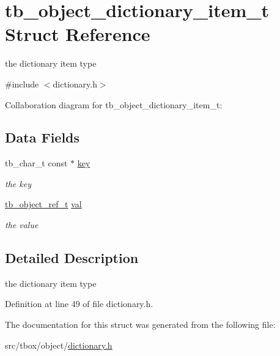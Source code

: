 \hypertarget{structtb__object__dictionary__item__t}{\section{tb\-\_\-object\-\_\-dictionary\-\_\-item\-\_\-t Struct Reference}
\label{structtb__object__dictionary__item__t}
}


the dictionary item type  




{\ttfamily \#include $<$dictionary.\-h$>$}



Collaboration diagram for tb\-\_\-object\-\_\-dictionary\-\_\-item\-\_\-t\-:
\subsection*{Data Fields}
\begin{DoxyCompactItemize}
\item 
\hypertarget{structtb__object__dictionary__item__t_a26ba6fd725d74d817a64a8b3f57b97d3}{tb\-\_\-char\-\_\-t const $\ast$ \hyperlink{structtb__object__dictionary__item__t_a26ba6fd725d74d817a64a8b3f57b97d3}{key}}\label{structtb__object__dictionary__item__t_a26ba6fd725d74d817a64a8b3f57b97d3}

\begin{DoxyCompactList}\small\item\em the key \end{DoxyCompactList}\item 
\hypertarget{structtb__object__dictionary__item__t_a93234b08a682e9f396e6c103274ca085}{\hyperlink{structtb__object__t}{tb\-\_\-object\-\_\-ref\-\_\-t} \hyperlink{structtb__object__dictionary__item__t_a93234b08a682e9f396e6c103274ca085}{val}}\label{structtb__object__dictionary__item__t_a93234b08a682e9f396e6c103274ca085}

\begin{DoxyCompactList}\small\item\em the value \end{DoxyCompactList}\end{DoxyCompactItemize}


\subsection{Detailed Description}
the dictionary item type 

Definition at line 49 of file dictionary.\-h.



The documentation for this struct was generated from the following file\-:\begin{DoxyCompactItemize}
\item 
src/tbox/object/\hyperlink{dictionary_8h}{dictionary.\-h}\end{DoxyCompactItemize}
